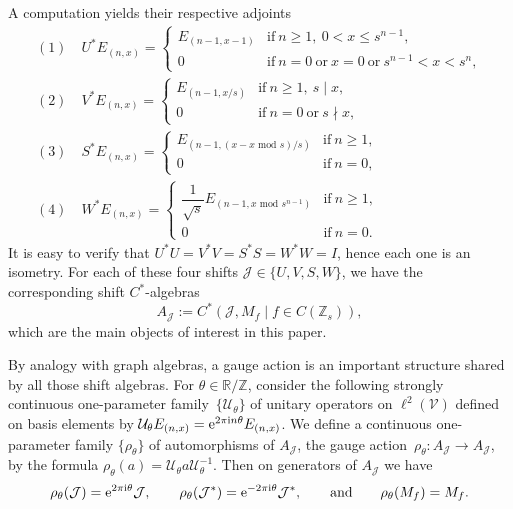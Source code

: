 \documentclass[pdftex]{sigma}
\newcommand{\R}{{\mathbb R}}
\newcommand{\Z}{{\mathbb Z}}
\numberwithin{equation}{section}
\begin{document}
A computation yields their respective adjoints
\begin{gather*}
(1) \quad U^*E_{(n,x)} =
\begin{cases}
E_{(n-1, x-1)} &\textrm{if}\ n\ge1,\ 0<x\le s^{n-1} ,\\
0 &\textrm{if}\ n=0 \ \textrm{or}\ x=0\ \textrm{or}\ s^{n-1}<x<s^n,
\end{cases}
\\
(2) \quad
V^*E_{(n,x)} =
\begin{cases}
E_{(n-1, x/s)} &\textrm{if}\ n\ge1,\ s\mid x,\\
0 &\textrm{if}\ n=0\ \textrm{or}\ s\nmid x,
\end{cases}\\
(3)\quad
S^*E_{(n,x)} =
\begin{cases}
E_{(n-1, (x-x\textrm{ mod }s)/s)} &\textrm{if}\ n\ge1,\\
0&\textrm{if}\ n=0,
\end{cases}\\
(4) \quad
W^*E_{(n,x)} =
\begin{cases}
\dfrac{1}{\sqrt{s}}E_{(n-1, x\textrm{ mod }s^{n-1})} &\textrm{if}\ n\ge1,\\
0&\textrm{if}\ n=0.
\end{cases}
\end{gather*}
It is easy to verify that
$U^*U=V^*V=S^*S=W^*W=I$,
hence each one is an isometry. For each of these four shifts $\mathcal{J}\in\{U, V, S, W\}$, we have the corresponding shift $C^*$-algebras
\begin{equation*}
A_{\mathcal{J}} := C^*(\mathcal{J},M_f \mid f\in C(\Z_s)) ,
\end{equation*}
which are the main objects of interest in this paper.

By analogy with graph algebras, a gauge action is an important structure shared by all those shift algebras. For $\theta\in\R/\Z$, consider the following strongly continuous one-parameter family~$\{\mathcal{U}_\theta\}$ of unitary operators on $\ell^2(\mathcal{V})$ defined on basis elements by
$
\mathcal{U}_\theta E_{(n,x)}={\rm e}^{2\pi {\rm i}n\theta}E_{(n,x)}$.
We define a continuous one-parameter family $\{\rho_\theta\}$ of automorphisms of $A_{\mathcal{J}}$, the gauge action~${\rho_\theta\colon A_{\mathcal{J}}\to A_{\mathcal{J}}}$, by the formula
$\rho_\theta(a)=\mathcal{U}_\theta a \mathcal{U}_\theta^{-1}$.
Then on generators of $A_{\mathcal{J}}$ we have
\begin{equation*}
\rho_\theta(\mathcal{J})={\rm e}^{2\pi {\rm i}\theta}\mathcal{J} ,\qquad \rho_\theta(\mathcal{J}^*)={\rm e}^{-2\pi {\rm i}\theta}\mathcal{J}^* ,\qquad\textrm{and}\qquad \rho_\theta(M_f) = M_f .
\end{equation*}
\end{document}
